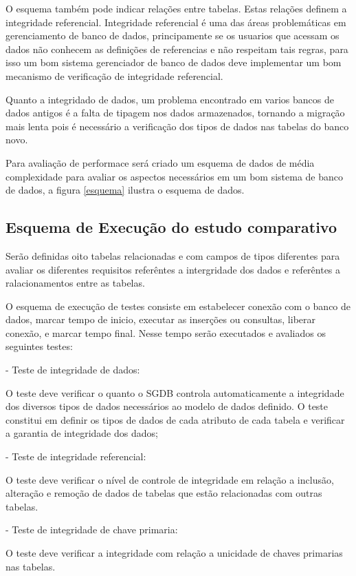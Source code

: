 O esquema também pode indicar relações entre tabelas. Estas relações definem a integridade referencial. Integridade referencial é uma das áreas problemáticas em gerenciamento de banco de dados, principamente se os usuarios que acessam os dados não conhecem as definições de referencias e não respeitam tais regras, para isso um bom sistema gerenciador de banco de dados deve implementar um bom mecanismo de verificação de integridade referencial.

Quanto a integridado de dados, um problema encontrado em varios bancos de dados antigos é a falta de tipagem nos dados armazenados, tornando a migração mais lenta pois é necessário a verificação dos tipos de dados nas tabelas do banco novo.

Para avaliação de performace será criado um esquema de dados de média complexidade para avaliar os aspectos necessários em um bom 
sistema de banco de dados, a figura \ref{esquema} ilustra o esquema de dados.

\subsection{Esquema de Execução do estudo comparativo}
\label{cha:sub2esquema}

Serão definidas oito tabelas relacionadas e com campos de tipos diferentes para avaliar os diferentes requisitos referêntes a intergridade dos dados e referêntes a ralacionamentos entre as tabelas.

O esquema de execução de testes consiste em estabelecer conexão com o banco de dados, marcar tempo de inicio, executar as inserções ou consultas, liberar conexão, e marcar tempo final. Nesse tempo serão executados e avaliados os seguintes testes:

- Teste de integridade de dados: 

O teste deve verificar o quanto o SGDB  controla automaticamente a integridade dos diversos tipos de dados necessários ao modelo de dados definido. O teste constitui em definir os tipos de dados de cada atributo de cada tabela e verificar a garantia de integridade dos dados;

- Teste de integridade referencial:

O teste deve verificar o nível de controle de integridade em relação a inclusão, alteração e remoção de dados de tabelas que estão relacionadas com outras tabelas.

- Teste de integridade de chave primaria:

O teste deve verificar a integridade com relação a unicidade de chaves primarias nas tabelas.

